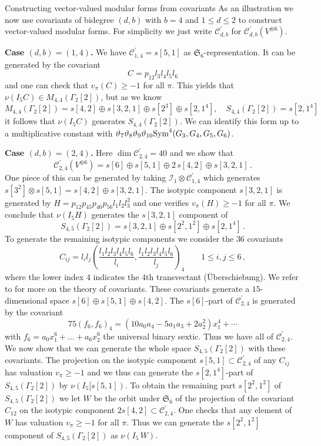 \documentclass[12pt]{amsart}
\numberwithin{equation}{section}
\def\leq{\leqslant}
\def\geq{\geqslant}
\numberwithin{equation}{section}
\theoremstyle{definition}
\theoremstyle{remark}
\begin{document}
\begin{section}{Constructing vector-valued modular forms from covariants}
\bigskip
As an illustration we now use covariants of bidegree $(d,b)$  with $b=4$ and $1 \leq d \leq 2$
to construct vector-valued modular forms. For simplicity we just write $\mathcal{C}^{\prime}_{d,b}$
for $\mathcal{C}^{\prime}_{d,b}(V^{\oplus 6})$.

{\bf Case $(d,b)=(1,4)$.} 
We have $\mathcal{C}^{\prime}_{1,4}=s[5,1]$ as $\mathfrak{S}_6$-representation. It can be generated by the
covariant
$$
C= p_{12}l_3l_4l_5l_6
$$
and one can check that $v_{\pi}(C)\geq -1$ for all $\pi$. This yields that $\nu(I_5C) \in M_{4,4}(\Gamma_2[2])$,
but as we know
$$
M_{4,4}(\Gamma_2[2])=s[4,2]\oplus s[3,2,1]\oplus s[2^3]\oplus s[2,1^4], \quad S_{4,4}(\Gamma_2[2])=s[2,1^4]
$$
it follows that $\nu(I_5C)$ generates $S_{4,4}(\Gamma_2[2])$.
We can identify this form up to a multiplicative constant with 
$\vartheta_7\vartheta_8\vartheta_9\vartheta_{10} {\rm Sym}^4(G_3,G_4,G_5,G_6)$.

\bigskip
{\bf Case $(d,b)=(2,4)$.} Here $\dim \mathcal{C}^{\prime}_{2,4}=40$ and we show that
$$
\mathcal{C}^{\prime}_{2,4}(V^{\oplus 6})= s[6]\oplus s[5,1]\oplus 2\, s[4,2] \oplus s[3,2,1] \, .
$$
One piece of this can be generated by taking $\mathcal{I}_1\otimes \mathcal{C}^{\prime}_{1,4}$
which generates $s[3^2]\otimes s[5,1]=s[4,2]\oplus s[3,2,1]$. The isotypic
component $s[3,2,1]$ is generated by $H=p_{12}p_{45}p_{46}p_{56}l_1l_2l_3^2$ and
one verifies $v_{\pi}(H)\geq -1$ for all $\pi$. We conclude that $\nu(I_5H)$ generates the $s[3,2,1]$
component of 
$$
S_{4,5}(\Gamma_2[2])=s[3,2,1]\oplus s[2^2,1^2]\oplus s[2,1^4] \, .
$$
To generate the remaining isotypic components we consider the $36$ covariants 
$$
C_{ij}=l_i l_j \left(\frac{l_1l_2l_3l_4l_5l_6}{l_i},\frac{l_1l_2l_3l_4l_5l_6}{l_j}\right)_4
\qquad 1 \leq i,j\leq 6\, ,
$$
where the lower index $4$ indicates the $4$th transvectant  (\"Uberschiebung). 
We refer to \cite[Section 2]{CFG2}
for more on the theory of covariants.
These covariants generate a $15$-dimensional space $s[6]\oplus s[5,1]\oplus s[4,2]$.
The $s[6]$-part of $\mathcal{C}^{\prime}_{2,4}$ is generated by the covariant
$$
75 (f_6,f_6)_4= (10a_0a_4-5a_1a_3+2a_2^2)x_1^4+ \cdots
$$
with $f_6=a_0x_1^6+\ldots + a_6x_2^6$ the universal binary sextic.
Thus we have all of $\mathcal{C}^{\prime}_{2,4}$. We now show that we can generate the whole
space $S_{4,5}(\Gamma_2[2])$ with these covariants. 
The projection on the isotypic component $s[5,1]\subset \mathcal{C}^{\prime}_{2,4}$
of any $C_{ij}$ has valuation $v_{\pi}\geq -1$ and we thus can generate
the $s[2,1^4]$-part of $S_{4,5}(\Gamma_2[2])$ by $\nu(I_5[s[5,1])$. 
To obtain the remaining part $s[2^2,1^2]$ of $S_{4,5}(\Gamma_2[2])$ we let $W$
be the orbit under $\mathfrak{S}_6$ of the projection of the covariant $C_{12}$ 
on the isotypic component $2s[4,2] \subset \mathcal{C}^{\prime}_{2,4}$.
One checks that any element of $W$ has valuation $v_{\pi}\geq -1$ for all $\pi$.
Thus we can generate the $s[2^2,1^2]$ component of $S_{4,5}(\Gamma_2[2])$ as
$\nu(I_5 \, W)$.


\end{section}
\end{document}
